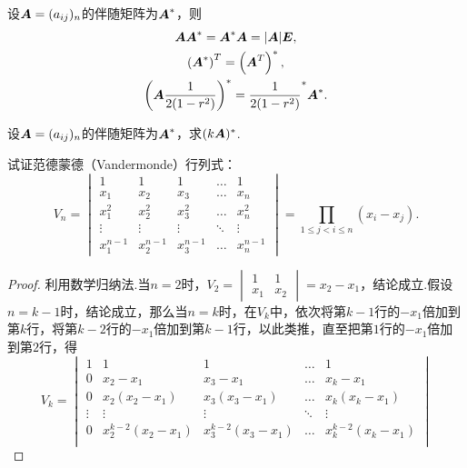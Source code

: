 \begin{theorem}
设\(\boldsymbol{A}=(a_{ij})_n\)的伴随矩阵为\(\boldsymbol{A}^*\)，则\begin{gather}
\boldsymbol{A} \boldsymbol{A}^* = \boldsymbol{A}^* \boldsymbol{A} = \abs{\boldsymbol{A}} \boldsymbol{E}, \label{equation:行列式.伴随矩阵.恒等式1} \\
\left(\boldsymbol{A}^*\right)^T = \left(\boldsymbol{A}^T\right)^*, \label{equation:行列式.伴随矩阵.恒等式2} \\
\left(\boldsymbol{A}\frac{1}{2(1-r^2)}\right)^* = \frac{1}{2(1-r^2)}^* \boldsymbol{A}^*. \label{equation:行列式.伴随矩阵.恒等式3}
\end{gather}
\end{theorem}

\begin{example}
设\(\boldsymbol{A}=(a_{ij})_n\)的伴随矩阵为\(\boldsymbol{A}^*\)，求\((k\boldsymbol{A})^*\).
\end{example}

\begin{example}
试证范德蒙德（Vandermonde）行列式：\begin{equation}\label{equation:行列式.范德蒙德行列式}
V_n = \begin{vmatrix}
1 & 1 & 1 & \dots & 1 \\
x_1 & x_2 & x_3 & \dots & x_n \\
x_1^2 & x_2^2 & x_3^2 & \dots & x_n^2 \\
\vdots & \vdots & \vdots& \ddots& \vdots \\
x_1^{n-1} & x_2^{n-1} & x_3^{n-1} & \dots & x_n^{n-1}
\end{vmatrix}=\prod\limits_{1 \leqslant j < i \leqslant n}{(x_i-x_j)}.
\end{equation}
\begin{proof}
利用数学归纳法.当\(n=2\)时，\(V_2 = \begin{vmatrix} 1 & 1 \\ x_1 & x_2 \end{vmatrix} = x_2 - x_1\)，结论成立.假设\(n=k-1\)时，结论成立，那么当\(n=k\)时，在\(V_k\)中，依次将第\(k-1\)行的\(-x_1\)倍加到第\(k\)行，将第\(k-2\)行的\(-x_1\)倍加到第\(k-1\)行，以此类推，直至把第\(1\)行的\(-x_1\)倍加到第\(2\)行，得\[
V_k = \begin{vmatrix}
1 & 1 & 1 & \dots & 1 \\
0 & x_2 - x_1 & x_3 - x_1 & \dots & x_k - x_1 \\
0 & x_2(x_2 - x_1) & x_3(x_3 - x_1) & \dots & x_k(x_k - x_1) \\
\vdots & \vdots & \vdots & \ddots & \vdots \\
0 & x_2^{k-2}(x_2 - x_1) & x_3^{k-2}(x_3 - x_1) & \dots & x_k^{k-2}(x_k - x_1) \\

\end{vmatrix}\]
\end{proof}
\end{example}
